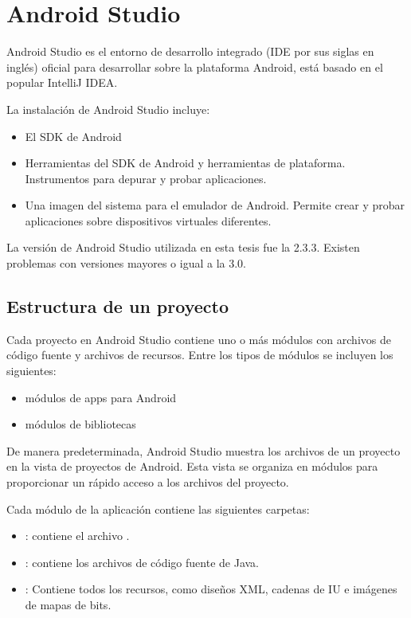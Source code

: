 
\section*{ Android Studio}
\label{\detokenize{dev_docs:android-studio}}
Android Studio es el entorno de desarrollo integrado (IDE por sus siglas en
inglés) oficial para desarrollar sobre la plataforma Android, está basado en
el popular IntelliJ IDEA.

La instalación de Android Studio incluye:
\begin{itemize}
\item {} 
El SDK de Android

\item {} 
Herramientas del SDK de Android y herramientas de plataforma. Instrumentos para
depurar y probar aplicaciones.

\item {} 
Una imagen del sistema para el emulador de Android. Permite crear y probar aplicaciones sobre dispositivos virtuales diferentes.

\end{itemize}

La versión de Android Studio utilizada en esta tesis fue la 2.3.3. Existen problemas
con versiones mayores o igual a la 3.0.


\subsection*{Estructura de un proyecto}
\label{\detokenize{dev_docs:estructura-de-un-proyecto}}
Cada proyecto en Android Studio contiene uno o más módulos con archivos de código fuente y archivos de recursos. Entre los tipos de módulos se incluyen los siguientes:
\begin{itemize}
\item {} 
módulos de apps para Android

\item {} 
módulos de bibliotecas


\end{itemize}

De manera predeterminada, Android Studio muestra los archivos de un proyecto en la vista de proyectos de Android. Esta vista se organiza en módulos para proporcionar un rápido acceso a los archivos del proyecto.

Cada módulo de la aplicación contiene las siguientes carpetas:
\begin{itemize}
\item {} 
: contiene el archivo .

\item {} 
: contiene los archivos de código fuente de Java.

\item {} 
: Contiene todos los recursos, como diseños XML, cadenas de IU e imágenes de mapas de bits.

\end{itemize}

